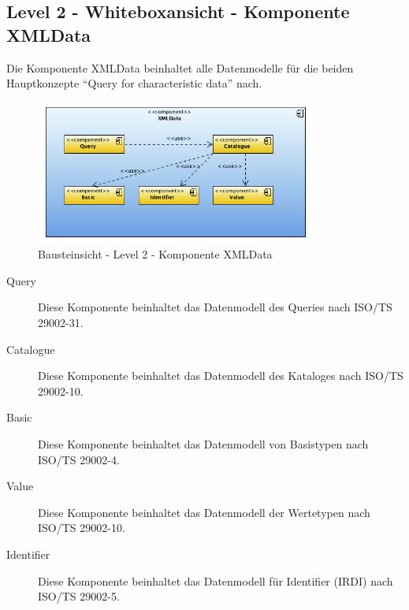 \subsection{Level 2 - Whiteboxansicht - Komponente XMLData}

Die Komponente XMLData beinhaltet alle Datenmodelle für die beiden Hauptkonzepte \enquote{Query for characteristic data} nach. 

\begin{figure}[htbp]
	\centering
		\includegraphics[width=0.82\textwidth]{images/bausteinsicht_plib_level2_xmldata.jpg}
	\caption{Bausteinsicht - Level 2 - Komponente XMLData}
	\label{fig:bausteinsicht_level2_xmldata}
\end{figure}

\begin{description}
\item[Query] Diese Komponente beinhaltet das Datenmodell des Queries nach ISO/TS 29002-31. 
\item[Catalogue] Diese Komponente beinhaltet das Datenmodell des Kataloges nach ISO/TS 29002-10. 
\item[Basic] Diese Komponente beinhaltet das Datenmodell von Basistypen nach ISO/TS 29002-4.
\item[Value] Diese Komponente beinhaltet das Datenmodell der Wertetypen nach ISO/TS 29002-10.
\item[Identifier] Diese Komponente beinhaltet das Datenmodell für Identifier (IRDI) nach ISO/TS 29002-5. 
\end{description}

